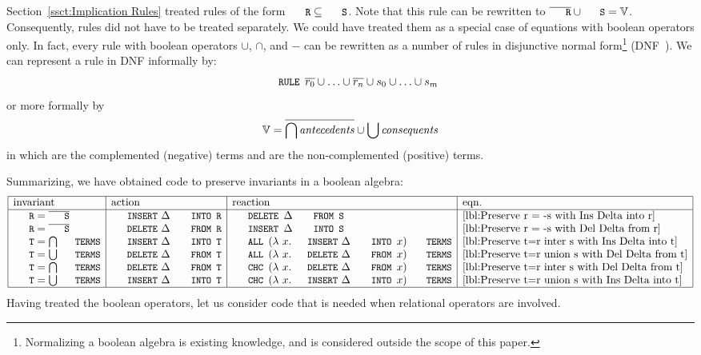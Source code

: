 \documentclass{svproc}
\begin{document}
	Section~\ref{ssct:Implication Rules} treated rules of the form $\code{R}\subs\code{S}$.
	Note that this rule can be rewritten to $\cmpl{\code{R}}\cup\code{S}=\full$.
	Consequently, rules did not have to be treated separately.
	We could have treated them as a special case of equations with boolean operators only.
	In fact, every rule with boolean operators $\cup$, $\cap$, and $-$ can be rewritten as a number of rules in disjunctive normal form\footnote{%
	Normalizing a boolean algebra is existing knowledge, and is considered outside the scope of this paper.} (DNF~\cite{davey1990}).
	We can represent a rule in DNF informally by:
\begin{eqnarray}
\code{RULE }\cmpl{r_0}\cup\ldots\cup\cmpl{r_n}\cup s_0\cup\ldots\cup s_m
\end{eqnarray}
	or more formally by
\begin{eqnarray}
\mathbb{V}=\overline{\bigcap\text{\em antecedents\/}}\cup\bigcup\text{\em consequents\/}
\end{eqnarray}
	in which  are the complemented (negative) terms and  are the non-complemented (positive) terms.

	Summarizing, we have obtained code to preserve invariants in a boolean algebra:
\[\begin{array}{|l|l|l|l|}
\hline
\text{invariant}&\text{action}&\text{reaction}&\text{eqn.}\\ \hline
\code{R}=\cmpl{\code{S}}&\code{INSERT}\ \Delta\code{ INTO R}&\code{DELETE }\Delta\code{ FROM S}&\ref{lbl:Preserve r = -s with Ins Delta into r}\\
\code{R}=\cmpl{\code{S}}&\code{DELETE}\ \Delta\code{ FROM R}&\code{INSERT }\Delta\code{ INTO S}&\ref{lbl:Preserve r = -s with Del Delta from r}\\
\code{T}=\bigcap\code{TERMS}&\code{INSERT}\ \Delta\code{ INTO T}&\code{ALL }(\lambda\ x.\code{INSERT}\ \Delta\code{ INTO }x)\ \code{TERMS}&\ref{lbl:Preserve t=r inter s with Ins Delta into t}\\
\code{T}=\bigcup\code{TERMS}&\code{DELETE}\ \Delta\code{ FROM T}&\code{ALL }(\lambda\ x.\code{DELETE}\ \Delta\code{ FROM }x)\ \code{TERMS}&\ref{lbl:Preserve t=r union s with Del Delta from t}\\
\code{T}=\bigcap\code{TERMS}&\code{DELETE}\ \Delta\code{ FROM T}&\code{CHC }(\lambda\ x.\code{DELETE}\ \Delta\code{ FROM }x)\ \code{TERMS}&\ref{lbl:Preserve t=r inter s with Del Delta from t}\\
\code{T}=\bigcup\code{TERMS}&\code{INSERT}\ \Delta\code{ INTO T}&\code{CHC }(\lambda\ x.\code{INSERT}\ \Delta\code{ INTO }x)\ \code{TERMS}&\ref{lbl:Preserve t=r union s with Ins Delta into t}\\ \hline
\end{array}\]
	Having treated the boolean operators, let us consider code that is needed when relational operators are involved.
\end{document}
